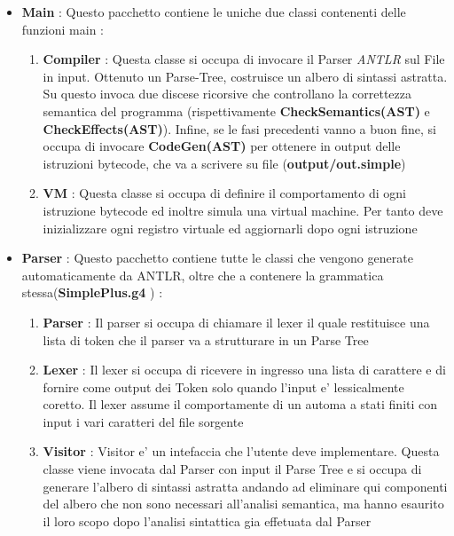 \documentclass{article}
\begin{document}
\begin{itemize}
     \item \textbf{Main} : Questo pacchetto contiene le uniche due classi contenenti delle funzioni main : 
     \begin{enumerate}
         \item \textbf{Compiler } : Questa classe si occupa di invocare il Parser \textit{ANTLR} sul File in input. Ottenuto un Parse-Tree, costruisce un albero di sintassi astratta. Su questo invoca due discese ricorsive che controllano la correttezza semantica del programma (rispettivamente \textbf{CheckSemantics(AST)} e \textbf{CheckEffects(AST)}). Infine, se le fasi precedenti vanno a buon fine, si occupa di invocare \textbf{CodeGen(AST)} per ottenere in output delle istruzioni bytecode, che va a scrivere su file (\textbf{output/out.simple})
         \item \textbf{VM} : Questa classe si occupa di definire il comportamento di ogni istruzione bytecode ed inoltre simula una virtual machine. Per tanto deve inizializzare ogni registro virtuale ed aggiornarli dopo ogni istruzione
     \end{enumerate}
     \item\textbf{Parser } : Questo pacchetto contiene tutte le classi che vengono generate automaticamente da ANTLR, oltre che a contenere la grammatica stessa(\textbf{SimplePlus.g4 }) :
     \begin{enumerate}
         \item \textbf{Parser }: Il parser si occupa di chiamare il lexer il quale restituisce una lista di token che il parser va a strutturare in un Parse Tree
          \item \textbf{Lexer }: Il lexer si occupa di ricevere in ingresso una lista di carattere e di fornire come output dei Token solo quando  l'input e' lessicalmente  coretto. Il lexer assume il comportamente di un automa a stati finiti con input i vari caratteri del file sorgente
          
         \item \textbf{Visitor }: Visitor  e' un intefaccia che l'utente deve implementare. Questa classe viene invocata dal Parser con input il Parse Tree  e si occupa di generare l'albero di sintassi astratta andando ad eliminare qui componenti del albero che non sono necessari all'analisi semantica, ma hanno esaurito il loro scopo dopo l'analisi sintattica gia effetuata dal Parser
        

\end{enumerate}
\end{itemize}
\end{document}
